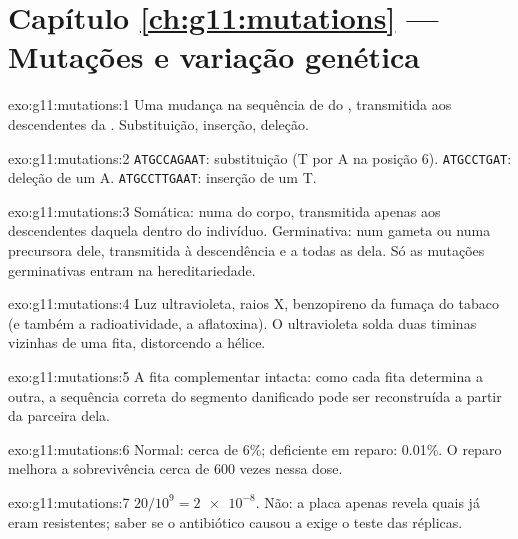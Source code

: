 \section*{Capítulo \ref{ch:g11:mutations} --- Mutações e variação genética}

\begin{solution}{exo:g11:mutations:1}
Uma mudança na sequência de  do , transmitida aos
descendentes da . Substituição, inserção, deleção.
\end{solution}

\begin{solution}{exo:g11:mutations:2}
\texttt{ATGCCAGAAT}: substituição (T por A na posição 6).
\texttt{ATGCCTGAT}: deleção de um A. \texttt{ATGCCTTGAAT}: inserção de
um T.
\end{solution}

\begin{solution}{exo:g11:mutations:3}
Somática: numa  do corpo, transmitida apenas aos descendentes
daquela  dentro do indivíduo. Germinativa: num gameta ou numa
precursora dele, transmitida à descendência e a todas as  dela.
Só as mutações germinativas entram na hereditariedade.
\end{solution}

\begin{solution}{exo:g11:mutations:4}
Luz ultravioleta, raios X, benzopireno da fumaça do tabaco (e também a
radioatividade, a aflatoxina). O ultravioleta solda duas timinas
vizinhas de uma fita, distorcendo a hélice.
\end{solution}

\begin{solution}{exo:g11:mutations:5}
A fita complementar intacta: como cada fita determina a outra, a
sequência correta do segmento danificado pode ser reconstruída a partir
da parceira dela.
\end{solution}

\begin{solution}{exo:g11:mutations:6}
Normal: cerca de 6\%; deficiente em reparo: 0.01\%. O reparo melhora a
sobrevivência cerca de 600 vezes nessa dose.
\end{solution}

\begin{solution}{exo:g11:mutations:7}
$20/10^9 = \num{2e-8}$. Não: a placa apenas revela quais  já
eram resistentes; saber se o antibiótico causou a  exige o teste
das réplicas.
\end{solution}

